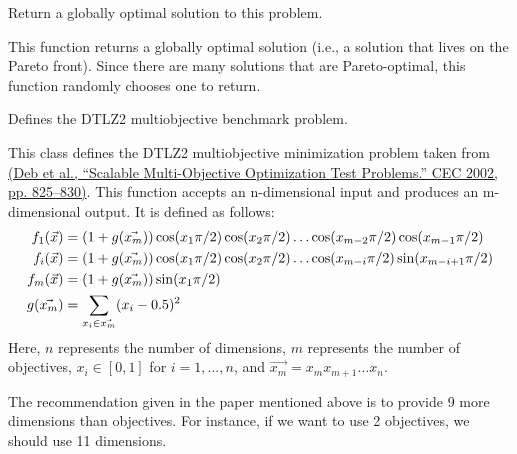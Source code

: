 \documentclass[letterpaper,10pt,english]{sphinxmanual}
\begin{document}
\begin{fulllineitems}
\begin{fulllineitems}
\label{reference:inspyred.benchmarks.DTLZ1.global_optimum}
Return a globally optimal solution to this problem.

This function returns a globally optimal solution (i.e., a 
solution that lives on the Pareto front). Since there are many
solutions that are Pareto-optimal, this function randomly 
chooses one to return.

\end{fulllineitems}


\end{fulllineitems}


\begin{fulllineitems}
\label{reference:inspyred.benchmarks.DTLZ2}
Defines the DTLZ2 multiobjective benchmark problem.

This class defines the DTLZ2 multiobjective minimization problem
taken from \href{http://www.tik.ee.ethz.ch/sop/download/supplementary/testproblems/dtlz1/index.php}{(Deb et al., ``Scalable Multi-Objective Optimization Test Problems.''
CEC 2002, pp. 825--830)}.
This function accepts an n-dimensional input and produces an m-dimensional output.
It is defined as follows:
\begin{gather}
\begin{split}f_1(\vec{x}) &= (1 + g(\vec{x_m}))\cos(x_1 \pi/2)\cos(x_2 \pi/2)\dots\cos(x_{m-2} \pi/2)\cos(x_{m-1} \pi/2) \\
f_i(\vec{x}) &= (1 + g(\vec{x_m}))\cos(x_1 \pi/2)\cos(x_2 \pi/2)\dots\cos(x_{m-i} \pi/2)\sin(x_{m-i+1} \pi/2) \\
f_m(\vec{x}) &= (1 + g(\vec{x_m}))\sin(x_1 \pi/2) \\
g(\vec{x_m}) &= \sum_{x_i \in \vec{x_m}}(x_i - 0.5)^2 \\\end{split}\notag
\end{gather}
Here, $n$ represents the number of dimensions, $m$ represents the
number of objectives, $x_i \in [0, 1]$ for $i=1,...,n$, and 
$\vec{x_m} = x_m x_{m+1} \dots x_{n}.$

The recommendation given in the paper mentioned above is to provide 9 more
dimensions than objectives. For instance, if we want to use 2 objectives, we
should use 11 dimensions.


\end{fulllineitems}
\end{document}
